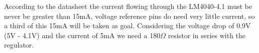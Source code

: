 			According to the datasheet the current flowing through the LM4040-4.1 must be never be greater than 15mA, voltage reference pins do need very little current, so a third of this 15mA will be taken as goal. Considering the voltage drop of 0.9V (5V - 4.1V) and the current of 5mA we need a 180$\Omega$ resistor in series with the regulator.
